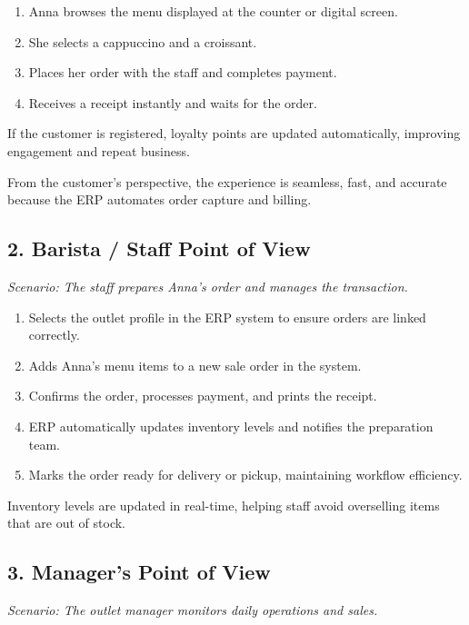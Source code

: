 \begin{enumerate}
    \item Anna browses the menu displayed at the counter or digital screen.  
    \item She selects a cappuccino and a croissant.  
    \item Places her order with the staff and completes payment.  
    \item Receives a receipt instantly and waits for the order.  
\end{enumerate}

\begin{tcolorbox}[colback=white,colframe=odooPurple,title=Tip, fonttitle=\bfseries, coltitle=white]
If the customer is registered, loyalty points are updated automatically, improving engagement and repeat business.
\end{tcolorbox}

From the customer's perspective, the experience is seamless, fast, and accurate because the ERP automates order capture and billing.

\subsection*{2. Barista / Staff Point of View}
\textit{Scenario: The staff prepares Anna's order and manages the transaction.}

\begin{enumerate}
    \item Selects the outlet profile in the ERP system to ensure orders are linked correctly.  
    \item Adds Anna’s menu items to a new sale order in the system.  
    \item Confirms the order, processes payment, and prints the receipt.  
    \item ERP automatically updates inventory levels and notifies the preparation team.  
    \item Marks the order ready for delivery or pickup, maintaining workflow efficiency.  
\end{enumerate}

\begin{tcolorbox}[colback=white,colframe=odooPurple,title=Note, fonttitle=\bfseries, coltitle=white]
Inventory levels are updated in real-time, helping staff avoid overselling items that are out of stock.
\end{tcolorbox}

\subsection*{3. Manager's Point of View}
\textit{Scenario: The outlet manager monitors daily operations and sales.}

